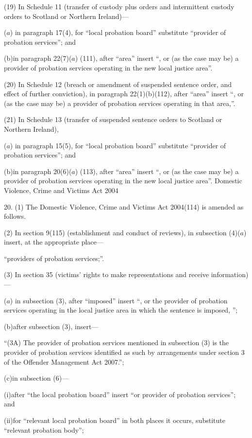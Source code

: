 \documentclass[12pt,a4paper]{article}
\begin{document}
(19) In Schedule 11 (transfer of custody plus orders and intermittent custody orders to Scotland or Northern Ireland)—

($a$) in paragraph 17(4), for “local probation board” substitute “provider of probation services”; and

(b)in paragraph 22(7)($a$)  (111), after “area” insert “, or (as the case may be) a provider of probation services operating in the new local justice area”.

(20) In Schedule 12 (breach or amendment of suspended sentence order, and effect of further conviction), in paragraph 22(1)(b)(112), after “area” insert “, or (as the case may be) a provider of probation services operating in that area,”.

(21) In Schedule 13 (transfer of suspended sentence orders to Scotland or Northern Ireland),

($a$) in paragraph 15(5), for “local probation board” substitute “provider of probation services”; and

(b)in paragraph 20(6)($a$) (113), after “area” insert “, or (as the case may be) a provider of probation services operating in the new local justice area”.
Domestic Violence, Crime and Victims Act 2004

20.  (1)  The Domestic Violence, Crime and Victims Act 2004(114) is amended as follows.

(2) In section 9(115) (establishment and conduct of reviews), in subsection (4)($a$)  insert, at the appropriate place—

“providers of probation services;”.

(3) In section 35 (victims’ rights to make representations and receive information)—

($a$) in subsection (3), after “imposed” insert “, or the provider of probation services operating in the local justice area in which the sentence is imposed, ”;

(b)after subsection (3), insert—

“(3A) The provider of probation services mentioned in subsection (3) is the provider of probation services identified as such by arrangements under section 3 of the Offender Management Act 2007.”;

(c)in subsection (6)—

(i)after “the local probation board” insert “or provider of probation services”; and

(ii)for “relevant local probation board” in both places it occurs, substitute “relevant probation body”;
\end{document}
